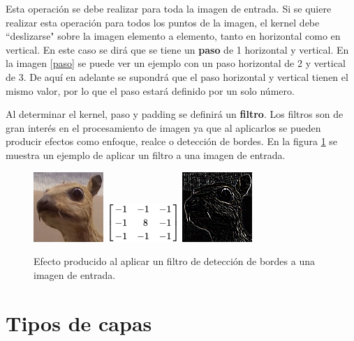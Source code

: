 Esta operación se debe realizar para toda la imagen de entrada. Si se quiere realizar esta operación para todos los puntos de la imagen, el kernel debe ``deslizarse" sobre la imagen elemento a elemento, tanto en horizontal como en vertical. En este caso se dirá que se tiene un \textbf{paso} de 1 horizontal y vertical. En la imagen \ref{paso} se puede ver un ejemplo con un paso horizontal de 2 y vertical de 3. De aquí en adelante se supondrá que el paso horizontal y vertical tienen el mismo valor, por lo que el paso estará definido por un solo número.


Al determinar el kernel, paso y padding se definirá un \textbf{filtro}. Los filtros son de gran interés en el procesamiento de imagen ya que al aplicarlos se pueden producir efectos como enfoque, realce o detección de bordes. En la figura \ref{fig:filtro} se muestra un ejemplo de aplicar un filtro a una imagen de entrada.

\begin{figure}[ht]
\centering
\includegraphics[scale=2]{img/filter_og.png}
\includegraphics[scale=1]{img/filter_edge_kernel.png}
\includegraphics[scale=2]{img/filter_edge.png}
\caption{Efecto producido al aplicar un filtro de detección de bordes a una imagen de entrada.}\bigskip
\label{fig:filtro}
\end{figure}

\section{Tipos de capas}\label{cnn_capas}

